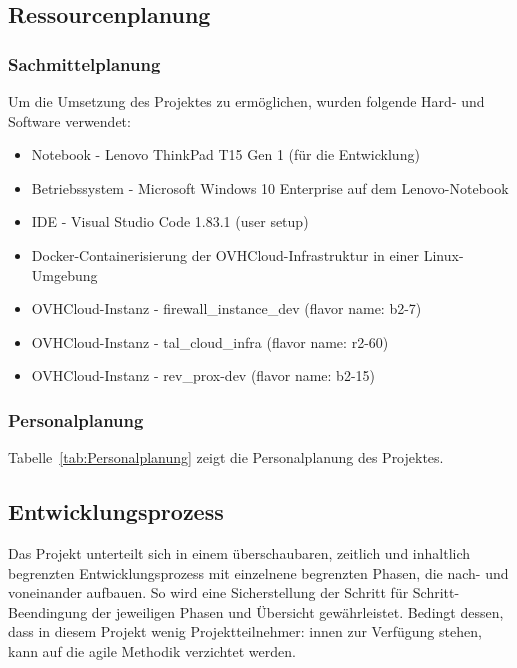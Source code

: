 \subsection{Ressourcenplanung}
\label{sec:Ressourcenplanung}

\subsubsection{Sachmittelplanung}
\label{sec:Sachmittelplanung}
Um die Umsetzung des Projektes zu ermöglichen, wurden folgende Hard- und Software verwendet:
\begin{itemize}
	\item Notebook - Lenovo ThinkPad T15 Gen 1 (für die Entwicklung)
	\item Betriebssystem - Microsoft Windows 10 Enterprise auf dem Lenovo-Notebook
	\item IDE - Visual Studio Code 1.83.1 (user setup)
	\item Docker-Containerisierung der OVHCloud-Infrastruktur in einer Linux-Umgebung
	\item OVHCloud-Instanz - firewall\_instance\_dev (flavor name: b2-7)
	\item OVHCloud-Instanz - tal\_cloud\_infra (flavor name: r2-60)
	\item OVHCloud-Instanz - rev\_prox-dev (flavor name: b2-15)
\end{itemize}

\subsubsection{Personalplanung}
\label{sec:Personalplanung}
Tabelle~\ref{tab:Personalplanung} zeigt die Personalplanung des Projektes.

\subsection{Entwicklungsprozess}
\label{sec:Entwicklungsprozess}
Das Projekt unterteilt sich in einem überschaubaren, zeitlich und inhaltlich begrenzten Entwicklungsprozess 
mit einzelnene begrenzten Phasen, die nach- und voneinander aufbauen. So wird eine Sicherstellung der Schritt 
für Schritt-Beendingung der jeweiligen Phasen und Übersicht gewährleistet. Bedingt dessen, dass in diesem Projekt 
wenig Projektteilnehmer: innen zur Verfügung stehen, kann auf die agile Methodik verzichtet werden.

